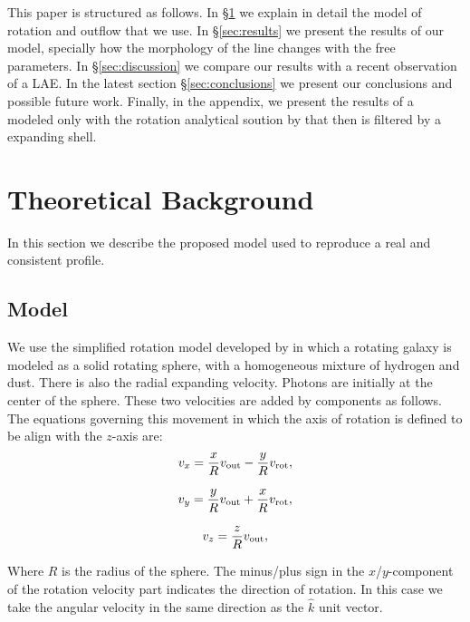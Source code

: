 \documentclass{latex/emulateapj}
\begin{document}
This paper is structured as follows. In \S \ref{sec:theo} we explain in detail the model of rotation and outflow that we use. In \S \ref{sec:results} we present the results of our model, specially how the morphology of the line changes with the free parameters. In \S \ref{sec:discussion} we compare our results with a recent observation of a LAE. In the latest section \S \ref{sec:conclusions} we present our conclusions and possible future work. Finally, in the appendix, we present the results of a \lya modeled only with the rotation analytical soution by \cite{Garavito14} that then is filtered by a \cite{Verhamme06} expanding shell.\\

\section{Theoretical Background}
\label{sec:theo}
In this section we describe the proposed model used to reproduce a real and consistent \lya profile. \\ 

\subsection{Model}

We use the simplified rotation model developed by \citep{Garavito14} in which a rotating galaxy is modeled as a solid rotating sphere, with a homogeneous mixture of hydrogen and dust. There is also the radial expanding velocity. Photons are initially at the center of the sphere. These two velocities are added by components as follows. The equations governing this movement in which the axis of rotation is defined to be align with the $z$-axis are: \\

\begin{equation}
v_{x}=\frac{x}{R}v_{\rm out}-\frac{y}{R}v_{\rm rot}, \label{subeq1}
\end{equation}

\begin{equation}
v_{y}=\frac{y}{R}v_{\rm out}+\frac{x}{R}v_{\rm rot}, \label{subeq2}
\end{equation}

\begin{equation}
v_{z}=\frac{z}{R}v_{\rm out}, \label{subeq3}
\end{equation}

Where $R$ is the radius of the sphere. The minus/plus sign in the $x$/$y$-component of the rotation velocity part indicates the direction of rotation. In this case we take the angular velocity in the same direction as the $\hat{k}$ unit vector. \\
\end{document}
